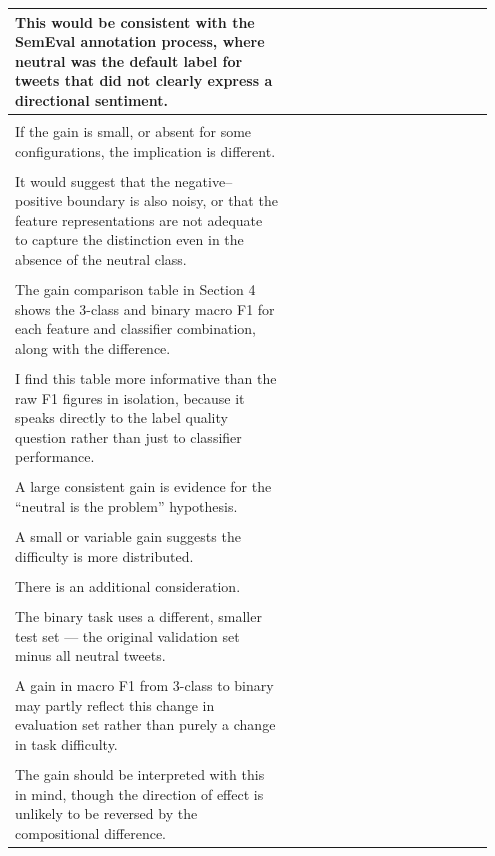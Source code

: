 \documentclass[11pt]{article}
\begin{document}
\begin{longtable}{|p{0.55\linewidth}|p{0.40\linewidth}|}
\hline
This would be consistent with the SemEval annotation process, where neutral was the default label for tweets that did not clearly express a directional sentiment. & \\[2pt]
\hline
\rule{0pt}{3.5cm} & \\
\hline
If the gain is small, or absent for some configurations, the implication is different. & \\[2pt]
\hline
\rule{0pt}{3.5cm} & \\
\hline
It would suggest that the negative--positive boundary is also noisy, or that the feature representations are not adequate to capture the distinction even in the absence of the neutral class. & \\[2pt]
\hline
\rule{0pt}{3.5cm} & \\
\hline
The gain comparison table in Section 4 shows the 3-class and binary macro F1 for each feature and classifier combination, along with the difference. & \\[2pt]
\hline
\rule{0pt}{3.5cm} & \\
\hline
I find this table more informative than the raw F1 figures in isolation, because it speaks directly to the label quality question rather than just to classifier performance. & \\[2pt]
\hline
\rule{0pt}{3.5cm} & \\
\hline
A large consistent gain is evidence for the ``neutral is the problem'' hypothesis. & \\[2pt]
\hline
\rule{0pt}{3.5cm} & \\
\hline
A small or variable gain suggests the difficulty is more distributed. & \\[2pt]
\hline
\rule{0pt}{3.5cm} & \\
\hline
There is an additional consideration. & \\[2pt]
\hline
\rule{0pt}{3.5cm} & \\
\hline
The binary task uses a different, smaller test set --- the original validation set minus all neutral tweets. & \\[2pt]
\hline
\rule{0pt}{3.5cm} & \\
\hline
A gain in macro F1 from 3-class to binary may partly reflect this change in evaluation set rather than purely a change in task difficulty. & \\[2pt]
\hline
\rule{0pt}{3.5cm} & \\
\hline
The gain should be interpreted with this in mind, though the direction of effect is unlikely to be reversed by the compositional difference. & \\[2pt]

\end{longtable}
\end{document}
